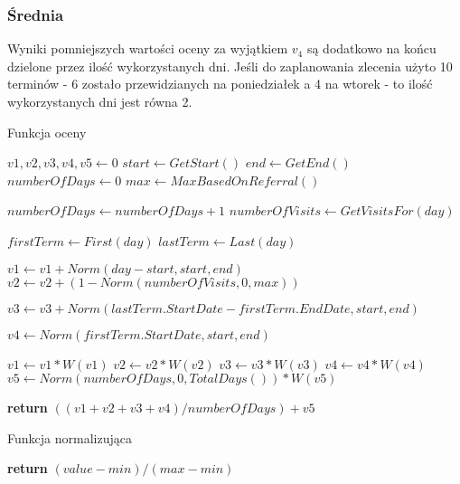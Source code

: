\subsubsection{Średnia} 
Wyniki pomniejszych wartości oceny za wyjątkiem $v_4$ są dodatkowo na końcu dzielone przez ilość
wykorzystanych dni. Jeśli do zaplanowania zlecenia użyto 10 terminów - 6 zostało
przewidzianych na poniedziałek a 4 na wtorek - to ilość wykorzystanych dni jest
równa 2.

\begin{algorithm}
\caption{Funkcja oceny}
\label{fn-obj}
\begin{algorithmic}[1]
\State $v1,v2,v3,v4,v5 \gets 0$
\State $start \gets GetStart()$
\State $end \gets GetEnd()$
\State $numberOfDays \gets 0$
\State $max \gets MaxBasedOnReferral()$

\State $numberOfDays \gets numberOfDays+1$
\State $numberOfVisits \gets GetVisitsFor(day)$

\State $firstTerm \gets First(day)$
\State $lastTerm \gets Last(day)$

\State $v1 \gets v1 + Norm(day-start,start,end)$
\State $v2 \gets v2 + (1 - Norm(numberOfVisits,0,max))$

\State $v3 \gets v3 + Norm(lastTerm.StartDate-firstTerm.EndDate,start,end)$
\EndIf

\State $v4 \gets Norm(firstTerm.StartDate,start,end)$

\EndFor
\State $v1 \gets v1*W(v1)$
\State $v2 \gets v2*W(v2)$
\State $v3 \gets v3*W(v3)$
\State $v4 \gets v4*W(v4)$
\State $v5 \gets Norm(numberOfDays,0,TotalDays())*W(v5)$

\State \textbf{return} $((v1+v2+v3+v4)/numberOfDays)+v5$
\EndProcedure
\end{algorithmic}
\end{algorithm}

\begin{algorithm}
	\caption{Funkcja normalizująca}\label{fn-normalize}
\begin{algorithmic}[1]
\State \textbf{return} $(value-min)/(max-min)$
\EndFunction
\end{algorithmic}
\end{algorithm}
\newpage
